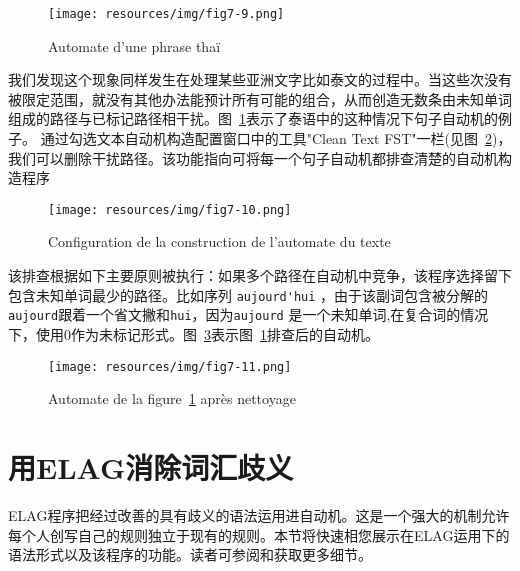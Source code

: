 \begin{figure}[!ht]
\begin{center}
\texttt{[image: resources/img/fig7-9.png]}
\caption{Automate d’une phrase thaï\label{fig-thai-sentence-automaton}}
\end{center}
\end{figure}

\bigskip
\noindent 我们发现这个现象同样发生在处理某些亚洲文字比如泰文的过程中。当这些次没有被限定范围，就没有其他办法能预计所有可能的组合，从而创造无数条由未知单词组成的路径与已标记路径相干扰。图~\ref{fig-thai-sentence-automaton}表示了泰语中的这种情况下句子自动机的例子。 
\bigskip
\noindent 通过勾选文本自动机构造配置窗口中的工具"Clean Text FST"一栏(见图~\ref{fig-Txt2Tfst-configuration})，我们可以删除干扰路径。该功能指向可将每一个句子自动机都排查清楚的自动机构造程序

\begin{figure}[!ht]
\begin{center}
\texttt{[image: resources/img/fig7-10.png]}
\caption{Configuration de la construction de l’automate du texte
\label{fig-Txt2Tfst-configuration}}
\end{center}
\end{figure}

\bigskip
\noindent  该排查根据如下主要原则被执行：如果多个路径在自动机中竞争，该程序选择留下包含未知单词最少的路径。比如序列 \verb+aujourd'hui+ ，由于该副词包含被分解的\verb+aujourd+跟着一个省文撇和\verb+hui+，因为\verb+aujourd+ 是一个未知单词,在复合词的情况下，使用0作为未标记形式。图~\ref{fig-clean-thai-sentence-automaton}表示图~\ref{fig-thai-sentence-automaton}排查后的自动机。

\begin{figure}[!ht]
\begin{center}
\texttt{[image: resources/img/fig7-11.png]}
\caption{Automate de la figure~\ref{fig-thai-sentence-automaton} après nettoyage\label{fig-clean-thai-sentence-automaton}}
\end{center}
\end{figure}


\section{用ELAG消除词汇歧义}
ELAG程序把经过改善的具有歧义的语法运用进自动机。这是一个强大的机制允许每个人创写自己的规则独立于现有的规则。本节将快速相您展示在ELAG运用下的语法形式以及该程序的功能。读者可参阅\cite{elag-blanc-dister}和\cite{ELAG}获取更多细节。

